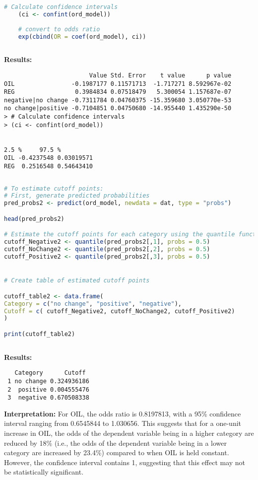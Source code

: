 \documentclass[12pt,letterpaper]{article}
\begin{document}
\begin{enumerate}
\begin{lstlisting}[language=R]
	# Calculate confidence intervals
	(ci <- confint(ord_model))
	
	# convert to odds ratio
	exp(cbind(OR = coef(ord_model), ci))
	
\end{lstlisting}
	
	\noindent \textbf{Results:}
	
	\begin{verbatim}
                        Value Std. Error    t value      p value
OIL                -0.1987177 0.11571713  -1.717271 8.592967e-02
REG                 0.3984834 0.07518479   5.300054 1.157687e-07
negative|no change -0.7311784 0.04760375 -15.359680 3.050770e-53
no change|positive -0.7104851 0.04750680 -14.955440 1.435290e-50
> # Calculate confidence intervals
> (ci <- confint(ord_model))


2.5 %     97.5 %
OIL -0.4237548 0.03019571
REG  0.2516548 0.54643410
	\end{verbatim}
	
	

	
	\begin{lstlisting}[language=R]
		
# To estimate cutoff points:
# First, generate predicted probabilities
pred_probs2 <- predict(ord_model, newdata = dat, type = "probs")

head(pred_probs2)

# Estimate the cutoff points for each category using the quantile function
cutoff_Negative2 <- quantile(pred_probs2[,1], probs = 0.5)
cutoff_NoChange2 <- quantile(pred_probs2[,2], probs = 0.5)
cutoff_Positive2 <- quantile(pred_probs2[,3], probs = 0.5)


# Create table of estimated cutoff points

cutoff_table2 <- data.frame(
Category = c("no change", "positive", "negative"),
Cutoff = c( cutoff_Negative2, cutoff_NoChange2, cutoff_Positive2)
)

print(cutoff_table2)
		
	\end{lstlisting}

\noindent \textbf{Results:}

\begin{verbatim}
   Category      Cutoff
 1 no change 0.324936186
 2  positive 0.004555476
 3  negative 0.670508338
\end{verbatim}


\noindent \textbf{Interpretation:}
    For OIL, the odds ratio is 0.8197813, with a 95\% confidence interval ranging from 0.6545844 to 1.030656. This suggests that for a one-unit increase in OIL, the odds of the dependent variable being in a higher category are reduced by 18\% (i.e., the odds of the dependent variable being in a lower category are increased by 23.4\%) compared to when OIL is held constant. However, the confidence interval contains 1, suggesting that this effect may not be statistically significant.


\end{enumerate}
\end{document}
